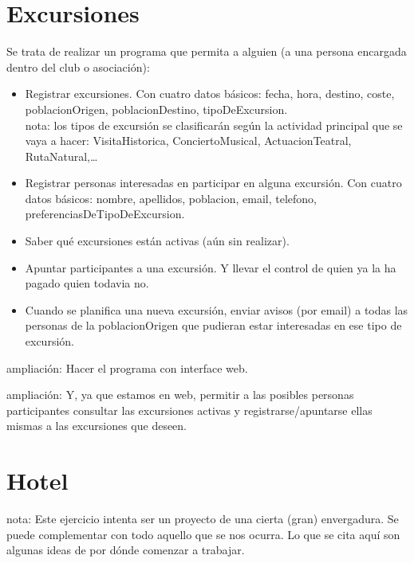 \documentclass[spanish,12pt,a4paper,final,oneside]{book}
\begin{document}
\section{Excursiones}\label{ejercicio_excursiones}

Se trata de realizar un programa que permita a alguien (a una persona encargada dentro del club o asociación):
\begin{itemize}

\item Registrar excursiones. Con cuatro datos básicos: fecha, hora, destino, coste, poblacionOrigen, poblacionDestino, tipoDeExcursion.
\\nota: los tipos de excursión se clasificarán según la actividad principal que se vaya a hacer: VisitaHistorica, ConciertoMusical, ActuacionTeatral, RutaNatural,\ldots 

\item Registrar personas interesadas en participar en alguna excursión. Con cuatro datos básicos: nombre, apellidos, poblacion, email, telefono, preferenciasDeTipoDeExcursion.

\item Saber qué excursiones están activas (aún sin realizar).

\item Apuntar participantes a una excursión. Y llevar el control de quien ya la ha pagado quien todavia no.

\item Cuando se planifica una nueva excursión, enviar avisos (por email) a todas las personas de la poblacionOrigen que pudieran estar interesadas en ese tipo de excursión.

\end{itemize}

ampliación: Hacer el programa con interface web.

ampliación: Y, ya que estamos en web, permitir a las posibles personas participantes consultar las excursiones activas y registrarse/apuntarse ellas mismas a las excursiones que deseen.



\section{Hotel}\label{ejercicio_hotel}

nota: Este ejercicio intenta ser un proyecto de una cierta (gran) envergadura. Se puede complementar con todo aquello que se nos ocurra. Lo que se cita aquí son algunas ideas de por dónde comenzar a trabajar.
\end{document}
